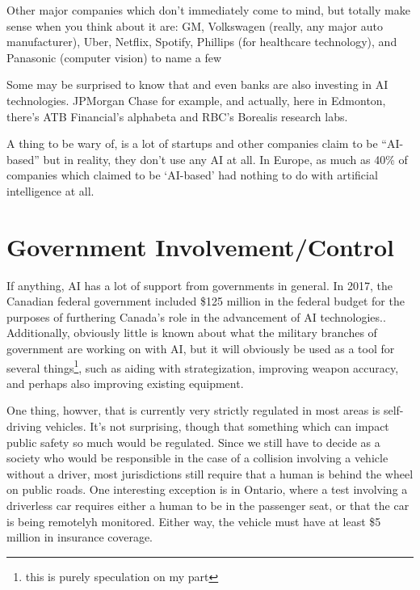 \documentclass[letterpaper,12pt]{article}
\begin{document}
Other major companies which don't immediately come to mind, but totally make sense when you think about it are:
GM,
Volkswagen (really, any major auto manufacturer),
Uber,
Netflix,
Spotify,
Phillips (for healthcare technology),
and
Panasonic (computer vision) to name a few
\cite{surpriseai}

Some may be surprised to know that and even banks are also investing in AI technologies.
JPMorgan Chase for example, and actually, here in Edmonton, there's ATB Financial's alphabeta and RBC's
Borealis research labs.

A thing to be wary of, is a lot of startups and other companies claim to be ``AI-based''
but in reality, they don't use any AI at all. In Europe, as much as 
40\% of companies which claimed to be `AI-based' had nothing to do
with artificial intelligence at all.
\cite{fakeaistartups}


\section{Government Involvement/Control}
If anything, AI has a lot of support from governments in general.
In 2017, the Canadian federal government included \$125 million in the
federal budget for the purposes of furthering Canada's role in the
advancement of AI technologies.\cite{canadafederalfunding}. 
Additionally, obviously little is known about what the military
branches of government are working on with AI, but it will obviously
be used as a tool for several things\footnote{this is purely speculation on my part},
such as aiding with 
strategization, improving weapon accuracy, and perhaps also improving
existing equipment.

One thing, howver, that is currently very strictly regulated
in most areas is self-driving vehicles. It's not surprising,
though that something which can impact public safety so much
would be regulated. Since we still have to decide as a society
who would be responsible in the case of a collision
involving a vehicle without a driver, most
jurisdictions still require that a human is behind the wheel on public roads.
One interesting exception is in Ontario, where a test involving a driverless car
requires either a human to be in the passenger seat, or that the car is being
remotelyh monitored. Either way, the vehicle must have at least \$5 million
in insurance coverage.\cite{ontariodriverless}
\end{document}
